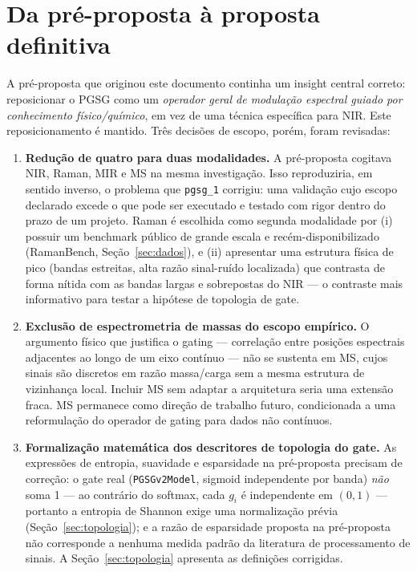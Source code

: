 \documentclass[11pt,a4paper]{article}
\begin{document}
\section{Da pré-proposta à proposta definitiva}

A pré-proposta que originou este documento continha um insight central correto: reposicionar o PGSG como um \emph{operador geral de modulação espectral guiado por conhecimento físico/químico}, em vez de uma técnica específica para NIR. Este reposicionamento é mantido. Três decisões de escopo, porém, foram revisadas:

\begin{enumerate}[label=(\alph*)]
\item \textbf{Redução de quatro para duas modalidades.} A pré-proposta cogitava NIR, Raman, MIR e MS na mesma investigação. Isso reproduziria, em sentido inverso, o problema que \texttt{pgsg\_1} corrigiu: uma validação cujo escopo declarado excede o que pode ser executado e testado com rigor dentro do prazo de um projeto. Raman é escolhida como segunda modalidade por (i) possuir um benchmark público de grande escala e recém-disponibilizado (RamanBench, Seção~\ref{sec:dados}), e (ii) apresentar uma estrutura física de pico (bandas estreitas, alta razão sinal-ruído localizada) que contrasta de forma nítida com as bandas largas e sobrepostas do NIR --- o contraste mais informativo para testar a hipótese de topologia de gate.
\item \textbf{Exclusão de espectrometria de massas do escopo empírico.} O argumento físico que justifica o gating --- correlação entre posições espectrais adjacentes ao longo de um eixo contínuo --- não se sustenta em MS, cujos sinais são discretos em razão massa/carga sem a mesma estrutura de vizinhança local. Incluir MS sem adaptar a arquitetura seria uma extensão fraca. MS permanece como direção de trabalho futuro, condicionada a uma reformulação do operador de gating para dados não contínuos.
\item \textbf{Formalização matemática dos descritores de topologia do gate.} As expressões de entropia, suavidade e esparsidade na pré-proposta precisam de correção: o gate real (\texttt{PGSGv2Model}, sigmoid independente por banda) \emph{não} soma 1 --- ao contrário do softmax, cada $g_i$ é independente em $(0,1)$ --- portanto a entropia de Shannon exige uma normalização prévia (Seção~\ref{sec:topologia}); e a razão de esparsidade proposta na pré-proposta não corresponde a nenhuma medida padrão da literatura de processamento de sinais. A Seção~\ref{sec:topologia} apresenta as definições corrigidas.
\end{enumerate}
\end{document}
